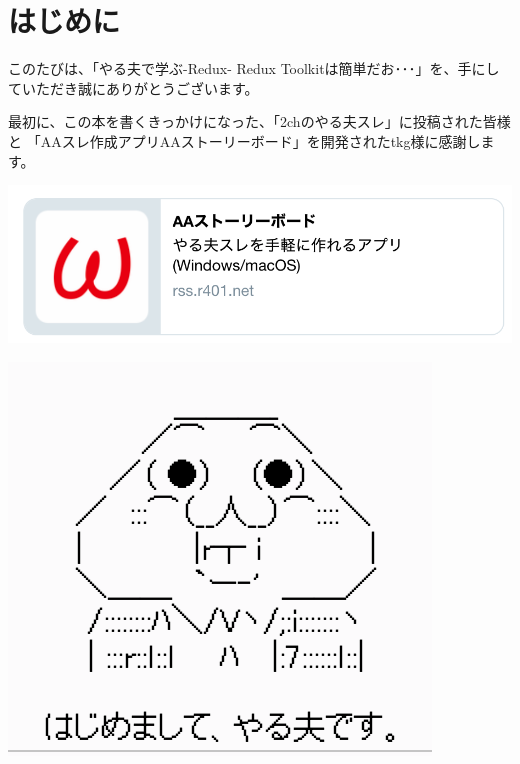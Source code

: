 \chapter{はじめに}
\label{chap:00-preface}

このたびは、「やる夫で学ぶ{-}Redux{-} Redux Toolkitは簡単だお･･･」を、手にしていただき誠にありがとうございます。

\vspace*{\baselineskip}

最初に、この本を書くきっかけになった、「2chのやる夫スレ」に投稿された皆様と
「AAスレ作成アプリAAストーリーボード」を開発されたtkg様に感謝します。

\begin{reviewimage}[H]%
\includegraphics[width=0.5\maxwidth]{./images/00-preface/r401.png}%
\label{image:00-preface:r401}
\end{reviewimage}
\begin{reviewimage}%
\includegraphics[width=0.8\maxwidth]{./images/00-preface/greetings.png}%
\label{image:00-preface:greetings}
\end{reviewimage}
\vspace*{\baselineskip}
\vspace*{\baselineskip}

